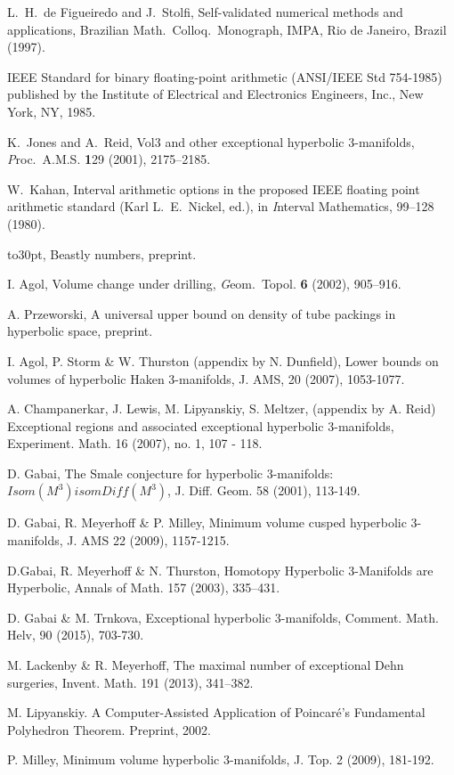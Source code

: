 \def\bibline{\hbox to30pt{\hrulefill}}

\begin{thebibliography}{CLLMR}

	 L.\ H.\ de Figueiredo and J.\ Stolfi, Self-validated
numerical methods and applications, Brazilian Math.\  Colloq.\  Monograph, IMPA, Rio de Janeiro, Brazil (1997).
 
  IEEE Standard for binary floating-point arithmetic
(ANSI/IEEE Std 754-1985) published by the Institute of 
Electrical and Electronics Engineers, Inc., New York, NY, 1985.
 
  K.\ Jones and A.\ Reid, Vol3 and other exceptional 
hyperbolic $3$-manifolds,  {\textit Proc.\ A.M.S.} {\textbf 129}
(2001), 2175--2185.
 
   W.\ Kahan, Interval arithmetic options in the 
proposed IEEE floating point arithmetic standard (Karl L.\ E.\ Nickel,
ed.), in  
{\textit Interval Mathematics\/}, 99--128 (1980). 
 
   \bibline, Beastly numbers, preprint.
 
  I. Agol, Volume change under drilling, {\textit Geom.\ Topol.\/} {\textbf 6} (2002), 905--916.

  A. Przeworski, A universal upper bound on density of tube packings in hyperbolic space,
preprint.

 I. Agol, P. Storm \& W. Thurston (appendix by N. Dunfield), Lower bounds on volumes of hyperbolic Haken 3-manifolds, J. AMS, 20 (2007), 1053-1077. 

 

 A. Champanerkar, J.  Lewis, M. Lipyanskiy, S. Meltzer, (appendix by A. Reid)
Exceptional regions and associated exceptional hyperbolic 3-manifolds, Experiment. Math. 16 (2007), no. 1, 107 - 118.

 D. Gabai, The Smale conjecture for hyperbolic 3-manifolds:  $Isom (M^3) isom Diff (M^3)$, J. Diff. Geom.  58 (2001), 113-149.


 D. Gabai, R. Meyerhoff \& P. Milley, Minimum volume cusped hyperbolic 3-manifolds, J. AMS 22 (2009), 1157-1215.

 D.Gabai, R. Meyerhoff \& N. Thurston, Homotopy Hyperbolic 3-Manifolds are Hyperbolic, Annals of Math. 157 (2003), 335–431.

 D. Gabai \& M. Trnkova, Exceptional hyperbolic 3-manifolds, Comment. Math. Helv, 90 (2015), 703-730.

 M. Lackenby \& R. Meyerhoff, The maximal number of exceptional Dehn surgeries, Invent. Math. 191 (2013), 341--382.


 M. Lipyanskiy. A Computer-Assisted Application
of Poincar\'e's Fundamental Polyhedron Theorem.
Preprint, 2002.

 P. Milley, Minimum volume hyperbolic 3-manifolds, J. Top. 2 (2009), 181-192.


\end{thebibliography}

 
